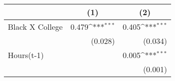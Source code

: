 {
\def\sym#1{\ifmmode^{#1}\else\(^{#1}\)\fi}
\begin{tabular}{l*{2}{D{.}{.}{-1}}}
\toprule
                &         &         \\
\midrule
Black X College &    0.479\sym{***}&    0.405\sym{***}\\
                &  (0.028)         &  (0.034)         \\
\addlinespace
Hours(t-1)      &                  &    0.005\sym{***}\\
                &                  &  (0.001)         \\
\bottomrule
\end{tabular}
}
